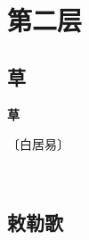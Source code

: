 \documentclass[12pt,UTF-8,openany,fontset=none]{ctexbook}
\begin{document}
\vspace{8pt}
\clearpage

\chapter{第二层}
\clearpage

\section{草}



\begin{center}
    {\bfseries 草}
\end{center}

\begin{center}
    \vspace{10pt}
    
    \begin{large}
        
        〔白居易〕
        
    \end{large}
    
    \vspace{8pt}
    
    \begin{huge}
        
        \phantom{。}

        \phantom{。}~~
        
        \phantom{。}\hspace{0.54em}\hspace{0.54em}

        \phantom{。}
        
    \end{huge}
    
\end{center}

\vspace{8pt}
\clearpage


\section{敕勒歌}

\end{document}
